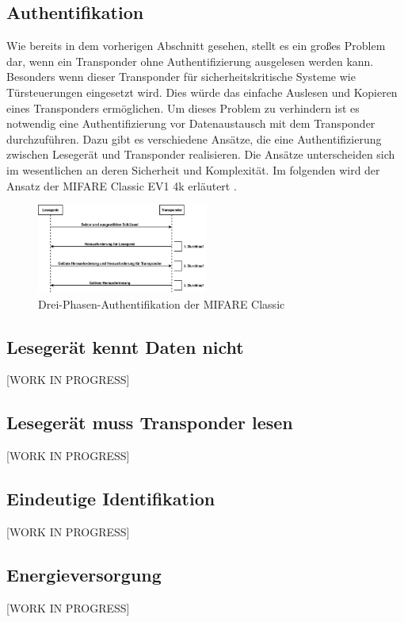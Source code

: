 \documentclass[conference]{IEEEtran}
\begin{document}
\subsection{Authentifikation}
Wie bereits in dem vorherigen Abschnitt gesehen, stellt es ein großes Problem dar, wenn ein Transponder ohne Authentifizierung ausgelesen werden kann. Besonders wenn dieser Transponder für sicherheitskritische Systeme wie Türsteuerungen eingesetzt wird. Dies würde das einfache Auslesen und Kopieren eines Transponders ermöglichen. Um dieses Problem zu verhindern ist es notwendig eine Authentifizierung vor Datenaustausch mit dem Transponder durchzuführen. Dazu gibt es verschiedene Ansätze, die eine Authentifizierung zwischen Lesegerät und Transponder realisieren. Die Ansätze unterscheiden sich im wesentlichen an deren Sicherheit und Komplexität. Im folgenden wird der Ansatz der MIFARE Classic EV1 4k erläutert \cite{b4}.

\begin{figure}[htbp]
\centerline{\includegraphics[width=0.5\textwidth]{img/three_pass.png}}
\caption{Drei-Phasen-Authentifikation der MIFARE Classic}
\label{fig4}
\end{figure}


\subsection{Lesegerät kennt Daten nicht}
[WORK IN PROGRESS]

\subsection{Lesegerät muss Transponder lesen}
[WORK IN PROGRESS]

\subsection{Eindeutige Identifikation}
[WORK IN PROGRESS]

\subsection{Energieversorgung}
[WORK IN PROGRESS]
\end{document}
